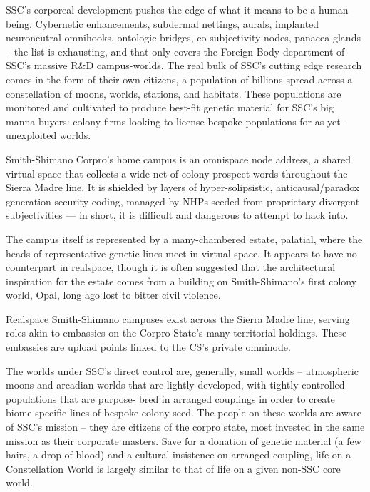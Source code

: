 SSC’s corporeal development pushes the edge of what it means to be a human being.  
Cybernetic enhancements, subdermal nettings, aurals, implanted neuroneutral omnihooks,  
ontologic bridges, co-subjectivity nodes, panacea glands -- the list is exhausting, and that only  
covers the Foreign Body department of SSC’s massive R\&D campus-worlds. The real bulk of  
SSC’s cutting edge research comes in the form of their own citizens, a population of billions  
spread across a constellation of moons, worlds, stations, and habitats. These populations are  
monitored and cultivated to produce best-fit genetic material for SSC’s big manna buyers:  
colony firms looking to license bespoke populations for as-yet-unexploited worlds. 
 

Smith-Shimano Corpro’s home campus is an omnispace node address, a shared virtual space  
that collects a wide net of colony prospect words throughout the Sierra Madre line. It is shielded  
by layers of hyper-solipsistic, anticausal/paradox generation security coding, managed by NHPs  
seeded from proprietary divergent subjectivities — in short, it is difficult and dangerous to  
attempt to hack into. 
 

The campus itself is represented by a many-chambered estate, palatial, where the heads of  
representative genetic lines meet in virtual space. It appears to have no counterpart in realspace,  
though it is often suggested that the architectural inspiration for the estate comes from a building  
on Smith-Shimano’s first colony world, Opal, long ago lost to bitter civil violence.  
 

Realspace Smith-Shimano campuses exist across the Sierra Madre line, serving roles akin to  
embassies on the Corpro-State’s many territorial holdings. These embassies are upload points  
linked to the CS’s private omninode.
 

The worlds under SSC’s direct control are, generally, small worlds -- atmospheric moons and  
arcadian worlds that are lightly developed, with tightly controlled populations that are purpose- 
bred in arranged couplings in order to create biome-specific lines of bespoke colony seed. The  
people on these worlds are aware of SSC’s mission -- they are citizens of the corpro state, most  
invested in the same mission as their corporate masters. Save for a donation of genetic material  
(a few hairs, a drop of blood) and a cultural insistence on arranged coupling, life on a  
Constellation World is largely similar to that of life on a given non-SSC core world. 
 

